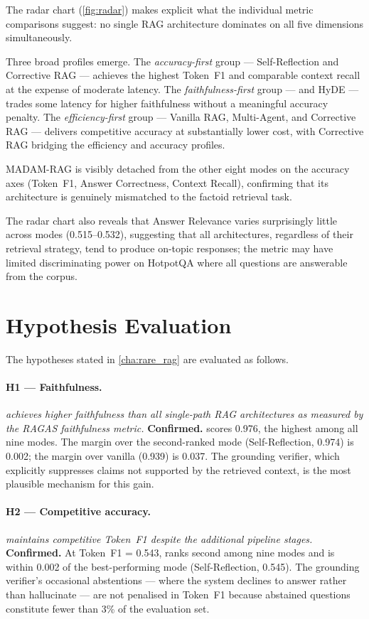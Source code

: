 The radar chart (\cref{fig:radar}) makes explicit what the individual metric
comparisons suggest: no single RAG architecture dominates on all five dimensions
simultaneously.

Three broad profiles emerge.
The \emph{accuracy-first} group --- Self-Reflection and Corrective RAG --- achieves
the highest Token~F1 and comparable context recall at the expense of moderate latency.
The \emph{faithfulness-first} group --- \rarerag{} and HyDE --- trades some latency
for higher faithfulness without a meaningful accuracy penalty.
The \emph{efficiency-first} group --- Vanilla RAG, Multi-Agent, and Corrective RAG ---
delivers competitive accuracy at substantially lower cost, with Corrective RAG
bridging the efficiency and accuracy profiles.

MADAM-RAG is visibly detached from the other eight modes on the accuracy axes
(Token~F1, Answer Correctness, Context Recall), confirming that its
architecture is genuinely mismatched to the factoid retrieval task.

The radar chart also reveals that Answer Relevance varies surprisingly little
across modes (0.515--0.532), suggesting that all architectures, regardless of
their retrieval strategy, tend to produce on-topic responses; the metric may
have limited discriminating power on HotpotQA where all questions are
answerable from the corpus.

\section{Hypothesis Evaluation}
\label{sec:hypothesis_eval}

The hypotheses stated in \cref{cha:rare_rag} are evaluated as follows.

\paragraph{H1 --- Faithfulness.}
\emph{\rarerag{} achieves higher faithfulness than all single-path RAG architectures
as measured by the RAGAS faithfulness metric.}
\textbf{Confirmed.} \rarerag{} scores 0.976, the highest among all nine modes.
The margin over the second-ranked mode (Self-Reflection, 0.974) is 0.002; the margin
over vanilla (0.939) is 0.037. The grounding verifier, which explicitly suppresses
claims not supported by the retrieved context, is the most plausible mechanism for this
gain.

\paragraph{H2 --- Competitive accuracy.}
\emph{\rarerag{} maintains competitive Token~F1 despite the additional pipeline stages.}
\textbf{Confirmed.} At Token~F1 = 0.543, \rarerag{} ranks second among nine modes and
is within 0.002 of the best-performing mode (Self-Reflection, 0.545). The grounding
verifier's occasional abstentions --- where the system declines to answer rather than
hallucinate --- are not penalised in Token~F1 because abstained questions constitute
fewer than 3\% of the evaluation set.

